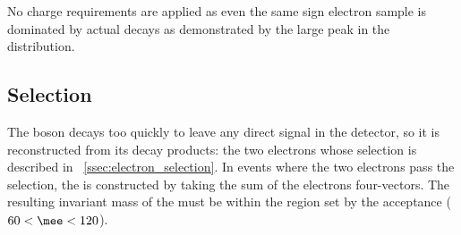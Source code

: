 No charge requirements are applied as even the same sign electron sample is
dominated by actual \Z decays as demonstrated by the large peak in the \mee
distribution.

\subsection{\Z Selection}

The \Z boson decays too quickly to leave any direct signal in the detector, so
it is reconstructed from its decay products: the two electrons whose selection
is described in \SEC~\ref{ssec:electron_selection}. In events where the two
electrons pass the selection, the \Z is constructed by taking the sum of the
electrons four-vectors. The resulting invariant mass of the \Z must be within
the region set by the acceptance ($60 < \mee < 120$).
